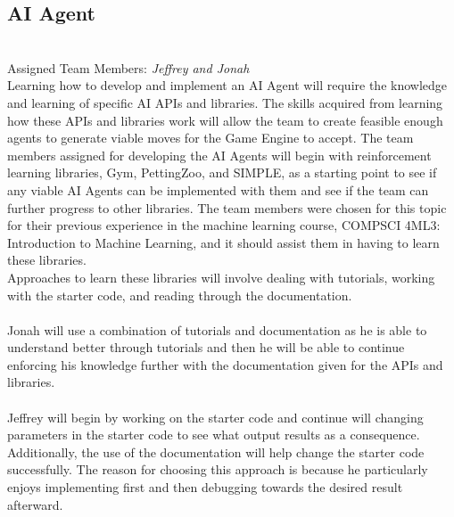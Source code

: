 \documentclass[12pt]{article}
\begin{document}
\subsection{AI Agent}
\\
Assigned Team Members: \textit{Jeffrey and Jonah}
\\
Learning how to develop and implement an AI Agent will require the knowledge and learning of specific AI APIs and libraries. The skills acquired from learning how these APIs and libraries work will allow the team to create feasible enough agents to generate viable moves for the Game Engine to accept. The team members assigned for developing the AI Agents will begin with reinforcement learning libraries, Gym, PettingZoo, and SIMPLE, as a starting point to see if any viable AI Agents can be implemented with them and see if the team can further progress to other libraries. The team members were chosen for this topic for their previous experience in the machine learning course, COMPSCI 4ML3: Introduction to Machine Learning, and it should assist them in having to learn these libraries.
\\
Approaches to learn these libraries will involve dealing with tutorials, working with the starter code, and reading through the documentation.
\\\\
Jonah will use a combination of tutorials and documentation as he is able to understand better through tutorials and then he will be able to continue enforcing his knowledge further with the documentation given for the APIs and libraries.
\\\\
Jeffrey will begin by working on the starter code and continue will changing parameters in the starter code to see what output results as a consequence. Additionally, the use of the documentation will help change the starter code successfully. The reason for choosing this approach is because he particularly enjoys implementing first and then debugging towards the desired result afterward.
\end{document}
